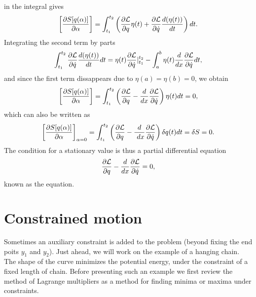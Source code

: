 \documentclass[letterpaper,10pt,english]{sphinxmanual}
\begin{document}
in the integral gives
\begin{equation*}
\begin{split}
\left[\frac{\partial  S[q(\alpha)]}{\partial \alpha}\right]=\int_{t_1}^{t_2} \left( \frac{\partial {\cal L}}{\partial q}\eta(t)+\frac{\partial {\cal L}}{\partial \dot{q}}\frac{d(\eta(t))}{dt}\right)dt.
\end{split}
\end{equation*}
Integrating the second term by parts
\begin{equation*}
\begin{split}
\int_{t_1}^{t_2} \frac{\partial {\cal L}}{\partial \dot{q}}\frac{d(\eta(t))}{dt}dt =\eta(t)\frac{\partial {\cal L}}{\partial \dot{q}}|_{t_1}^{t_2}-
\int_a^b \eta(t)\frac{d}{dx}\frac{\partial {\cal L}}{\partial \dot{q}}dt,
\end{split}
\end{equation*}
and since the first term dissappears due to \(\eta(a)=\eta(b)=0\), we obtain
\begin{equation*}
\begin{split}
\left[\frac{\partial  S[q(\alpha)]}{\partial \alpha}\right]=\int_{t_1}^{t_2} \left( \frac{\partial {\cal L}}{\partial q}-\frac{d}{dx}\frac{\partial {\cal L}}{\partial \dot{q}}
\right)\eta(t)dt=0,
\end{split}
\end{equation*}
which can also be written as
\begin{equation*}
\begin{split}
\left[\frac{\partial  S[q(\alpha)]}{\partial \alpha}\right]_{\alpha=0}=\int_{t_1}^{t_2} \left( \frac{\partial {\cal L}}{\partial q}-\frac{d}{\
dx}\frac{\partial {\cal L}}{\partial \dot{q}}\right)\delta q(t)dt=\delta S = 0.
\end{split}
\end{equation*}
The condition for a stationary value is thus a partial differential equation
\begin{equation*}
\begin{split}
\frac{\partial {\cal L}}{\partial q}-\frac{d}{dx}\frac{\partial {\cal L}}{\partial \dot{q}}=0,
\end{split}
\end{equation*}
known as the  equation.


\section{Constrained motion}
\label{\detokenize{chapter1:constrained-motion}}
Sometimes an auxiliary constraint is added to the problem (beyond
fixing the end poits \(y_1\) and \(y_2\)). Just ahead, we will work on the
example of a hanging chain. The shape of the curve minimizes the
potential energy, under the constraint of a fixed length of
chain. Before presenting such an example we first review the method of
Lagrange multipliers as a method for finding minima or maxima under
constraints.
\end{document}
